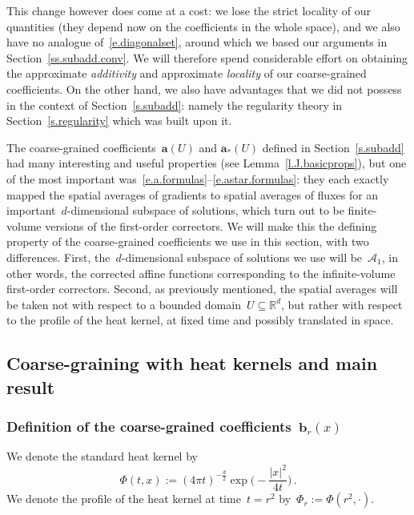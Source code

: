 \documentclass[11pt]{article} %
\numberwithin{equation}{section}
\theoremstyle{definition}
\newcommand*{\Rd}{\ensuremath{\mathbb{R}^d}}
\renewcommand{\b}{\ensuremath{\mathbf{b}}}
\renewcommand{\a}{\mathbf{a}}
\begin{document}
\smallskip

This change however does come at a cost: we lose the strict locality of our quantities (they depend now on the coefficients in the whole space), and we also have no analogue of~\eqref{e.diagonalset}, around which we based our arguments in Section~\ref{ss.subadd.conv}. 
We will therefore spend considerable effort on obtaining the approximate \emph{additivity} and approximate \emph{locality} of our coarse-grained coefficients. 
On the other hand, we also have advantages that we did not possess in the context of Section~\ref{s.subadd}: namely the regularity theory in Section~\ref{s.regularity} which was built upon it. 

\smallskip

The coarse-grained coefficients~$\a(U)$ and $\a_*(U)$ defined in Section~\ref{s.subadd} had many interesting and useful properties (see Lemma~\ref{l.J.basicprops}), but one of the most important was~\eqref{e.a.formulas}--\eqref{e.astar.formulas}: they each exactly mapped the spatial averages of gradients to spatial averages of fluxes for an important~$d$-dimensional subspace of solutions, which turn out to be finite-volume versions of the first-order correctors. 
We will make this the defining property of the coarse-grained coefficients we use in this section, with two differences. 
First, the~$d$-dimensional subspace of solutions we use will be~$\mathcal{A}_1$, in other words, the corrected affine functions corresponding to the infinite-volume first-order correctors. Second, as previously mentioned, the spatial averages will be taken not with respect to a bounded domain~$U\subseteq\Rd$, but rather with respect to the profile of the heat kernel, at fixed time and possibly translated in space.

\subsection{Coarse-graining with heat kernels and main result}

\subsubsection{Definition of the coarse-grained coefficients~$\b_r(x)$}
\label{ss.coarsegrain.with.tempo}
We denote the standard heat kernel by 
\begin{equation*}
\Phi(t,x) := (4\pi t)^{-\frac d2} \exp\biggl( -\frac{|x|^2}{4t} \biggr)\,.
\end{equation*}
We denote the profile of the heat kernel at time~$t=r^2$ by~$\Phi_r:= \Phi(r^2,\cdot)$.
\end{document}
